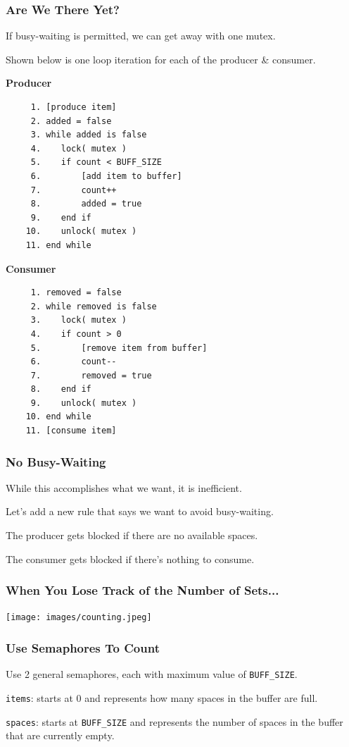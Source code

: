 \begin{frame}[fragile]
	\frametitle{Are We There Yet?}

	If busy-waiting is permitted, we can get away with one mutex.

	Shown below is one loop iteration for each of the producer \& consumer.
		{\small
			\begin{multicols}{2}
				\textbf{Producer}
				\begin{verbatim}
	 1. [produce item]
	 2. added = false
	 3. while added is false
	 4.    lock( mutex )
	 5.    if count < BUFF_SIZE
	 6.        [add item to buffer]
	 7.        count++
	 8.        added = true
	 9.    end if
	10.    unlock( mutex )
	11. end while
  				\end{verbatim}
				\columnbreak
				\textbf{Consumer}\vspace{-2em}
				\begin{verbatim}
	 1. removed = false
	 2. while removed is false
	 3.    lock( mutex )
	 4.    if count > 0
	 5.        [remove item from buffer]
	 6.        count--
	 7.        removed = true
	 8.    end if
	 9.    unlock( mutex )
	10. end while
	11. [consume item]
  				\end{verbatim}
			\end{multicols}
			\vspace{-2em}
		}

\end{frame}


\begin{frame}
	\frametitle{No Busy-Waiting}

	While this accomplishes what we want, it is inefficient.

	Let's add a new rule that says we want to avoid busy-waiting.

	The producer gets blocked if there are no available spaces.

	The consumer gets blocked if there's nothing to consume.

\end{frame}


\begin{frame}
	\frametitle{When You Lose Track of the Number of Sets...}

	\begin{center}
		\texttt{[image: images/counting.jpeg]}
	\end{center}

\end{frame}


\begin{frame}
	\frametitle{Use Semaphores To Count}

	Use 2 general semaphores, each with maximum value of \texttt{BUFF\_SIZE}.

	\texttt{items}: starts at 0 and represents how many spaces in the buffer are full.

	\texttt{spaces}: starts at \texttt{BUFF\_SIZE} and represents the number of spaces in the buffer that are currently empty.

\end{frame}


